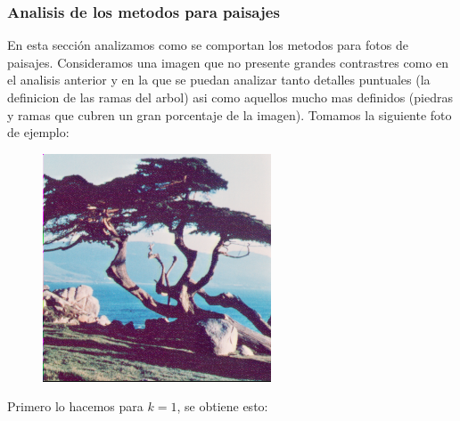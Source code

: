 \subsubsection{Analisis de los metodos para paisajes}

En esta sección analizamos como se comportan los metodos para fotos de paisajes. Consideramos una imagen que no presente grandes contrastres como en el analisis anterior y en la que se puedan analizar tanto detalles puntuales (la definicion de las ramas del arbol) asi como aquellos mucho mas definidos (piedras y ramas que cubren un gran porcentaje de la imagen). Tomamos la siguiente foto de ejemplo:

\begin{figure}[H]
\centering
\includegraphics[scale=0.50]{fotos/paisaje/orig.png}
\end{figure}

Primero lo hacemos para $k=1$, se obtiene esto:


